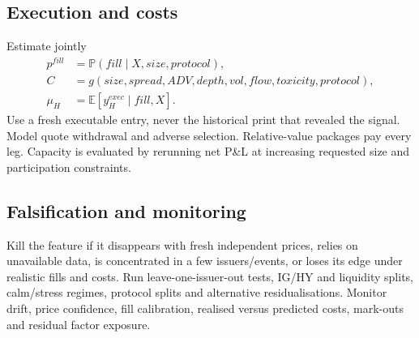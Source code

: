 \documentclass[10pt]{article}
\newcommand{\E}{\mathbb{E}}\newcommand{\Pp}{\mathbb{P}}
\begin{document}
\subsection{Execution and costs}
Estimate jointly
\begin{align}
p^{fill}&=\Pp(fill\mid X,size,protocol),\\
C&=g(size,spread,ADV,depth,vol,flow,toxicity,protocol),\\
\mu_H&=\E[y^{exec}_H\mid fill,X].
\end{align}
Use a fresh executable entry, never the historical print that revealed the signal. Model quote withdrawal and adverse selection. Relative-value packages pay every leg. Capacity is evaluated by rerunning net P\&L at increasing requested size and participation constraints.

\subsection{Falsification and monitoring}
Kill the feature if it disappears with fresh independent prices, relies on unavailable data, is concentrated in a few issuers/events, or loses its edge under realistic fills and costs. Run leave-one-issuer-out tests, IG/HY and liquidity splits, calm/stress regimes, protocol splits and alternative residualisations. Monitor drift, price confidence, fill calibration, realised versus predicted costs, mark-outs and residual factor exposure.
\end{document}
